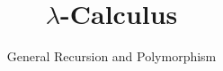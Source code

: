 
\usepackage{listings}
\title{$\lambda$-Calculus}
\subtitle{General Recursion and Polymorphism}


{
\begin{frame}\maketitle\end{frame}}

%

